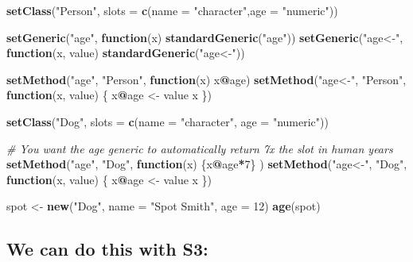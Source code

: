 \documentclass[]{book}
\newenvironment{Shaded}{\begin{snugshade}}{\end{snugshade}}
\newcommand{\CommentTok}[1]{\textcolor[rgb]{0.56,0.35,0.01}{\textit{#1}}}
\newcommand{\ControlFlowTok}[1]{\textcolor[rgb]{0.13,0.29,0.53}{\textbf{#1}}}
\newcommand{\DataTypeTok}[1]{\textcolor[rgb]{0.13,0.29,0.53}{#1}}
\newcommand{\DecValTok}[1]{\textcolor[rgb]{0.00,0.00,0.81}{#1}}
\newcommand{\KeywordTok}[1]{\textcolor[rgb]{0.13,0.29,0.53}{\textbf{#1}}}
\newcommand{\NormalTok}[1]{#1}
\newcommand{\OperatorTok}[1]{\textcolor[rgb]{0.81,0.36,0.00}{\textbf{#1}}}
\newcommand{\StringTok}[1]{\textcolor[rgb]{0.31,0.60,0.02}{#1}}
\begin{document}
\begin{Shaded}
\begin{Highlighting}[]
\KeywordTok{setClass}\NormalTok{(}\StringTok{"Person"}\NormalTok{, }\DataTypeTok{slots =} \KeywordTok{c}\NormalTok{(}\DataTypeTok{name =} \StringTok{"character"}\NormalTok{,}\DataTypeTok{age =} \StringTok{"numeric"}\NormalTok{))}

\KeywordTok{setGeneric}\NormalTok{(}\StringTok{"age"}\NormalTok{, }\ControlFlowTok{function}\NormalTok{(x) }\KeywordTok{standardGeneric}\NormalTok{(}\StringTok{"age"}\NormalTok{))}
\KeywordTok{setGeneric}\NormalTok{(}\StringTok{"age<-"}\NormalTok{, }\ControlFlowTok{function}\NormalTok{(x, value) }\KeywordTok{standardGeneric}\NormalTok{(}\StringTok{"age<-"}\NormalTok{))}

\KeywordTok{setMethod}\NormalTok{(}\StringTok{"age"}\NormalTok{, }\StringTok{"Person"}\NormalTok{, }\ControlFlowTok{function}\NormalTok{(x) x}\OperatorTok{@}\NormalTok{age)}
\KeywordTok{setMethod}\NormalTok{(}\StringTok{"age<-"}\NormalTok{, }\StringTok{"Person"}\NormalTok{, }\ControlFlowTok{function}\NormalTok{(x, value) \{}
\NormalTok{  x}\OperatorTok{@}\NormalTok{age <-}\StringTok{ }\NormalTok{value}
\NormalTok{  x}
\NormalTok{\})}

\KeywordTok{setClass}\NormalTok{(}\StringTok{"Dog"}\NormalTok{, }\DataTypeTok{slots =} \KeywordTok{c}\NormalTok{(}\DataTypeTok{name =} \StringTok{"character"}\NormalTok{,  }\DataTypeTok{age =} \StringTok{"numeric"}\NormalTok{))}

\CommentTok{# You want the age generic to automatically return 7x the slot in human years}
\KeywordTok{setMethod}\NormalTok{(}\StringTok{"age"}\NormalTok{, }\StringTok{"Dog"}\NormalTok{, }\ControlFlowTok{function}\NormalTok{(x) \{x}\OperatorTok{@}\NormalTok{age}\OperatorTok{*}\DecValTok{7}\NormalTok{\} ) }
\KeywordTok{setMethod}\NormalTok{(}\StringTok{"age<-"}\NormalTok{, }\StringTok{"Dog"}\NormalTok{, }\ControlFlowTok{function}\NormalTok{(x, value) \{}
\NormalTok{  x}\OperatorTok{@}\NormalTok{age <-}\StringTok{ }\NormalTok{value}
\NormalTok{  x}
\NormalTok{\})}


\NormalTok{spot <-}\StringTok{ }\KeywordTok{new}\NormalTok{(}\StringTok{"Dog"}\NormalTok{, }\DataTypeTok{name =} \StringTok{"Spot Smith"}\NormalTok{, }\DataTypeTok{age =} \DecValTok{12}\NormalTok{)}
\KeywordTok{age}\NormalTok{(spot)}
\end{Highlighting}
\end{Shaded}

\hypertarget{we-can-do-this-with-s3}{%
\subsection*{We can do this with S3:}\label{we-can-do-this-with-s3}}
\end{document}
